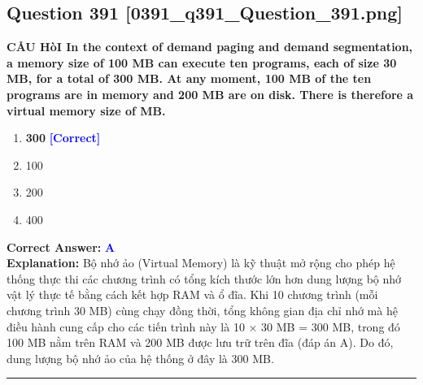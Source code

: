 \documentclass[11pt,a4paper]{article}
\begin{document}
\begin{minipage}{\textwidth}
\subsection*{Question 391 \quad \footnotesize{[0391\_q391\_Question\_391.png]}}
\noindent \textbf{CÅU HòI In the context of demand paging and demand segmentation, a memory size of 100 MB can execute ten programs, each of size 30 MB, for a total of 300 MB. At any moment, 100 MB of the ten programs are in memory and 200 MB are on disk. There is therefore a virtual memory size of MB.}

\begin{enumerate}[label=\Alph*.]
    \item \textbf{300} \hfill \textcolor{blue}{\textbf{[Correct]}}
    \item 100
    \item 200
    \item 400
\end{enumerate}

\noindent \textbf{Correct Answer:} \textcolor{blue}{\textbf{A}} \\[2pt]
\noindent \textbf{Explanation:} Bộ nhớ ảo (Virtual Memory) là kỹ thuật mở rộng cho phép hệ thống thực thi các chương trình có tổng kích thước lớn hơn dung lượng bộ nhớ vật lý thực tế bằng cách kết hợp RAM và ổ đĩa. Khi 10 chương trình (mỗi chương trình 30 MB) cùng chạy đồng thời, tổng không gian địa chỉ nhớ mà hệ điều hành cung cấp cho các tiến trình này là 10 × 30 MB = 300 MB, trong đó 100 MB nằm trên RAM và 200 MB được lưu trữ trên đĩa (đáp án A). Do đó, dung lượng bộ nhớ ảo của hệ thống ở đây là 300 MB.

\par\vspace{0.3cm}
\hrule
\vspace{0.3cm}
\end{minipage}
\end{document}

